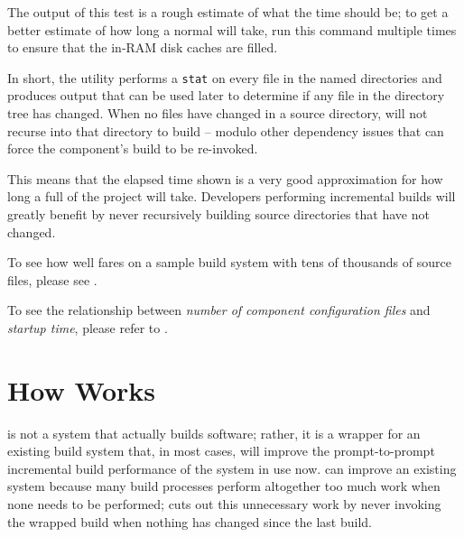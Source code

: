 \begin{center}\end{center}


The output of this test is a rough estimate of what the \nullbuild
time should be; to get a better estimate of how long a normal
\nullbuild will take, run this command multiple times to ensure that
the in-RAM disk caches are filled.

In short, the \mtree utility performs a \texttt{stat} on every file in
the named directories and produces output that can be used later to
determine if any file in the directory tree has changed.  When no
files have changed in a source directory, \lmsbw will not recurse into
that directory to build -- modulo other dependency issues that can
force the component's build to be re-invoked.

This means that the elapsed time shown is a very good approximation
for how long a full \nullbuild of the project will take.  Developers
performing incremental builds will greatly benefit by never
recursively building source directories that have not changed.

To see how well \lmsbw fares on a sample build system with tens of
thousands of source files, please see .

To see the relationship between \emph{number of component
  configuration files} and \emph{\lmsbw startup time}, please refer to
.

\section{How \lmsbw Works}

\lmsbw is not a system that actually builds software; rather, it is a
wrapper for an existing build system that, in most cases, will improve
the prompt-to-prompt incremental build performance of the system in
use now.  \lmsbw can improve an existing system because many build
processes perform altogether too much work when none needs to be
performed; \lmsbw cuts out this unnecessary work by never invoking the
wrapped build when nothing has changed since the last build.

